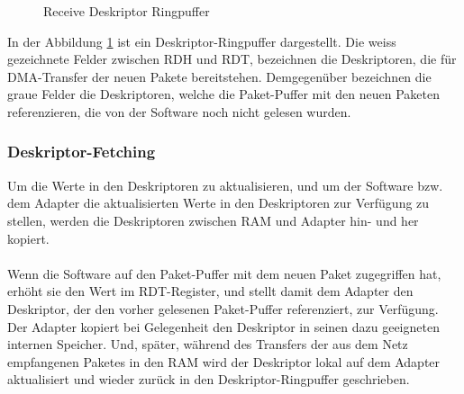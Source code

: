 {\begin{figure}
\caption{Receive Deskriptor Ringpuffer}
\label{img:rdrp}
\end{figure}
In der Abbildung \ref{img:rdrp} ist ein Deskriptor-Ringpuffer dargestellt.  Die
weiss gezeichnete Felder zwischen RDH und RDT, bezeichnen die Deskriptoren, die
für DMA-Transfer der neuen Pakete bereitstehen. Demgegenüber
bezeichnen die graue Felder die Deskriptoren, welche die Paket-Puffer mit den 
neuen Paketen referenzieren, die von der Software noch nicht gelesen wurden.

\subsubsection*{Deskriptor-Fetching}\label{sec:deskr_fetch} 
Um die Werte in den Deskriptoren zu aktualisieren, und um der Software bzw. dem
Adapter die aktualisierten Werte in den Deskriptoren zur Verfügung zu stellen, werden die
Deskriptoren zwischen RAM und Adapter hin- und her kopiert. \\\\
%
Wenn die Software auf den Paket-Puffer mit dem neuen Paket zugegriffen hat,
erhöht sie den Wert im RDT-Register, und stellt damit dem Adapter den
Deskriptor, der den vorher gelesenen Paket-Puffer referenziert, zur Verfügung.
Der Adapter kopiert bei Gelegenheit den Deskriptor in seinen dazu geeigneten
internen Speicher. Und, später, während des  Transfers der aus dem Netz
empfangenen Paketes  in den RAM wird der Deskriptor lokal auf dem Adapter
aktualisiert und wieder zurück in den Deskriptor-Ringpuffer geschrieben.

}
